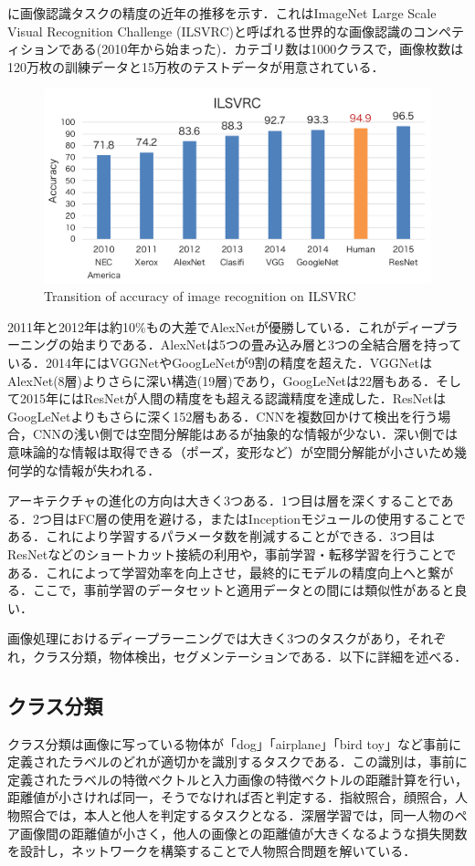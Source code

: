 に画像認識タスクの精度の近年の推移を示す．これはImageNet Large Scale Visual Recognition Challenge (ILSVRC)と呼ばれる世界的な画像認識のコンペティションである(2010年から始まった)．カテゴリ数は1000クラスで，画像枚数は120万枚の訓練データと15万枚のテストデータが用意されている．
\begin{figure}[H]
	\centering
	\includegraphics[width=0.7\linewidth]{fig/ILSVRC}
	\caption{Transition of accuracy of image recognition on ILSVRC}
	\label{fig:ImageNet}
\end{figure}
2011年と2012年は約10\%もの大差でAlexNet\cite{AlexNet}が優勝している．これがディープラーニングの始まりである．AlexNetは5つの畳み込み層と3つの全結合層を持っている．2014年にはVGGNet\cite{VGGNet}やGoogLeNet\cite{GoogLeNet}が9割の精度を超えた．VGGNetはAlexNet(8層)よりさらに深い構造(19層)であり，GoogLeNetは22層もある．そして2015年にはResNet\cite{ResNet}が人間の精度をも超える認識精度を達成した．ResNetはGoogLeNetよりもさらに深く152層もある．CNNを複数回かけて検出を行う場合，CNNの浅い側では空間分解能はあるが抽象的な情報が少ない．深い側では意味論的な情報は取得できる（ポーズ，変形など）が空間分解能が小さいため幾何学的な情報が失われる．

アーキテクチャの進化の方向は大きく3つある．1つ目は層を深くすることである．2つ目はFC層の使用を避ける，またはInceptionモジュールの使用することである．これにより学習するパラメータ数を削減することができる．3つ目はResNetなどのショートカット接続の利用や，事前学習・転移学習を行うことである．これによって学習効率を向上させ，最終的にモデルの精度向上へと繋がる．ここで，事前学習のデータセットと適用データとの間には類似性があると良い．

画像処理におけるディープラーニングでは大きく3つのタスクがあり，それぞれ，クラス分類，物体検出，セグメンテーションである．以下に詳細を述べる．

\subsection*{クラス分類}
クラス分類は画像に写っている物体が「dog」「airplane」「bird toy」など事前に定義されたラベルのどれが適切かを識別するタスクである．この識別は，事前に定義されたラベルの特徴べクトルと入力画像の特徴べクトルの距離計算を行い，距離値が小さければ同一，そうでなければ否と判定する．指紋照合，顔照合，人物照合では，本人と他人を判定するタスクとなる．深層学習では，同一人物のペア画像間の距離値が小さく，他人の画像との距離値が大きくなるような損失関数を設計し，ネットワークを構築することで人物照合問題を解いている．

